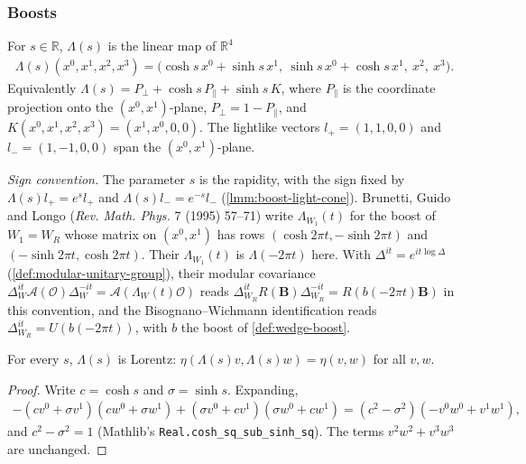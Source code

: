 \subsubsection{Boosts}

\begin{definition}
    \label{def:boost-matrix}
    \leanok
    For $s \in \mathbb{R}$, $\Lambda(s)$ is the linear map of $\mathbb{R}^4$
    \begin{align}
        \Lambda(s)(x^0, x^1, x^2, x^3) = \big(\cosh s\, x^0 + \sinh s\, x^1,\ \sinh s\, x^0 + \cosh s\, x^1,\ x^2,\ x^3\big).
    \end{align}
    Equivalently $\Lambda(s) = P_\perp + \cosh s\, P_\parallel + \sinh s\, K$, where $P_\parallel$ is the coordinate projection onto the $(x^0, x^1)$-plane, $P_\perp = 1 - P_\parallel$, and $K(x^0, x^1, x^2, x^3) = (x^1, x^0, 0, 0)$. The lightlike vectors $l_+ = (1, 1, 0, 0)$ and $l_- = (1, -1, 0, 0)$ span the $(x^0, x^1)$-plane.

    \emph{Sign convention.} The parameter $s$ is the rapidity, with the sign fixed by $\Lambda(s)l_+ = e^{s}l_+$ and $\Lambda(s)l_- = e^{-s}l_-$ (\ref{lmm:boost-light-cone}). Brunetti, Guido and Longo (\emph{Rev. Math. Phys.} 7 (1995) 57--71) write $\Lambda_{W_1}(t)$ for the boost of $W_1 = W_R$ whose matrix on $(x^0, x^1)$ has rows $(\cosh 2\pi t, -\sinh 2\pi t)$ and $(-\sinh 2\pi t, \cosh 2\pi t)$. Their $\Lambda_{W_1}(t)$ is $\Lambda(-2\pi t)$ here. With $\Delta^{it} = e^{it\log\Delta}$ (\ref{def:modular-unitary-group}), their modular covariance $\Delta_{W}^{it}\mathcal{A}(\mathcal{O})\Delta_W^{-it} = \mathcal{A}(\Lambda_W(t)\mathcal{O})$ reads $\Delta_{W_R}^{it}R(\mathbf{B})\Delta_{W_R}^{-it} = R(b(-2\pi t)\mathbf{B})$ in this convention, and the Bisognano--Wichmann identification reads $\Delta_{W_R}^{it} = U(b(-2\pi t))$, with $b$ the boost of \ref{def:wedge-boost}.
\end{definition}

\begin{lemma}
    \label{lmm:boost-matrix-lorentz}
    \leanok
    For every $s$, $\Lambda(s)$ is Lorentz: $\eta(\Lambda(s)v, \Lambda(s)w) = \eta(v, w)$ for all $v, w$.
\end{lemma}
\begin{proof}
    \leanok
    Write $c = \cosh s$ and $\sigma = \sinh s$. Expanding,
    \begin{align}
        -(cv^0 + \sigma v^1)(cw^0 + \sigma w^1) + (\sigma v^0 + cv^1)(\sigma w^0 + cw^1) = (c^2 - \sigma^2)(-v^0w^0 + v^1w^1),
    \end{align}
    and $c^2 - \sigma^2 = 1$ (Mathlib's \texttt{Real.cosh\_sq\_sub\_sinh\_sq}). The terms $v^2w^2 + v^3w^3$ are unchanged.
\end{proof}


